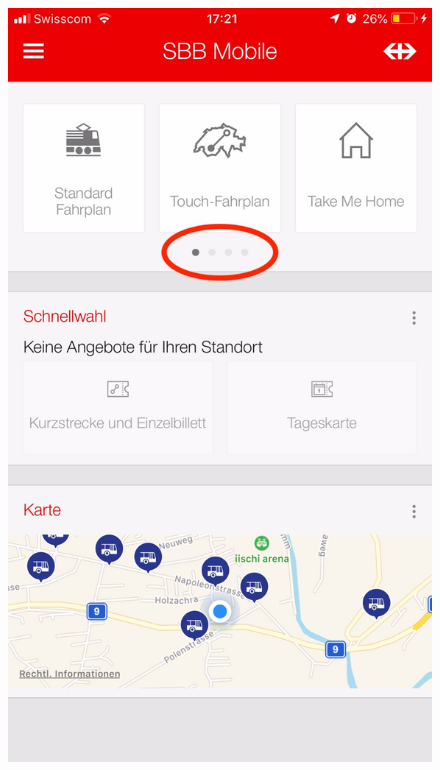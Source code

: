 \begin{figure}[H]
  \centering
  \begin{minipage}[b]{0.45\textwidth}
    \includegraphics[width=\textwidth]{data/SBB.jpeg}  

\end{minipage}
\end{figure}
